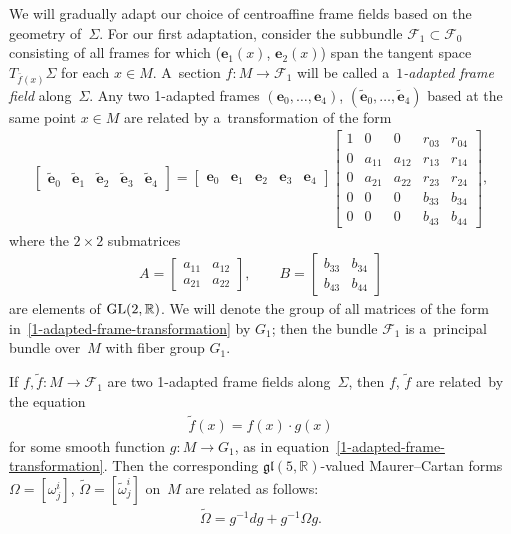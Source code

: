\documentclass[10pt,a4paper]{amsart}
\numberwithin{equation}{section}
\theoremstyle{definition}
\begin{document}
We will gradually adapt our choice of centroaf\/f\/ine frame f\/ields based on the geometry of~$\Sigma$.
For our f\/irst adaptation, consider the subbundle $\mathcal{F}_1 \subset \mathcal{F}_0$ consisting of all frames for
which ($\mathbf{e}_1(x)$, $\mathbf{e}_2(x)$) span the tangent space $T_{\bar{f}(x)}\Sigma$ for each $x \in M$.
A~section $f:M \to \mathcal{F}_1$ will be called a~{\em $1$-adapted frame field} along~$\Sigma$.
Any two 1-adapted frames $(\mathbf{e}_0, \ldots, \mathbf{e}_4)$, $(\tilde{\mathbf{e}}_0, \ldots, \tilde{\mathbf{e}}_4)$
based at the same point $x \in M$ are related by a~transformation of the form
\begin{gather}
\begin{bmatrix}
\tilde{\mathbf{e}}_0 & \tilde{\mathbf{e}}_1 & \tilde{\mathbf{e}}_2 & \tilde{\mathbf{e}}_3 & \tilde{\mathbf{e}}_4
\end{bmatrix}
=
\begin{bmatrix}
\mathbf{e}_0 & \mathbf{e}_1 & \mathbf{e}_2 & \mathbf{e}_3 & \mathbf{e}_4
\end{bmatrix}
\begin{bmatrix}
1 & 0 & 0 & r_{03} & r_{04}
\\
0 & a_{11} & a_{12} & r_{13} & r_{14}
\\
0 & a_{21} & a_{22} & r_{23} & r_{24}
\\
0 & 0 & 0 & b_{33} & b_{34}
\\
0 & 0 & 0 & b_{43} & b_{44}
\end{bmatrix},
\label{1-adapted-frame-transformation}
\end{gather}
where the $2\times 2$ submatrices
\begin{gather*}
A =
\begin{bmatrix}
a_{11} & a_{12}
\\
a_{21} & a_{22}
\end{bmatrix},
\qquad
B =
\begin{bmatrix}
b_{33} & b_{34}
\\
b_{43} & b_{44}
\end{bmatrix}
\end{gather*}
are elements of ${\rm GL}(2, \mathbb{R})$.
We will denote the group of all matrices of the form in~\eqref{1-adapted-frame-transformation} by $G_1$; then the bundle
$\mathcal{F}_1$ is a~principal bundle over~$M$ with f\/iber group $G_1$.

If $f, \tilde{f}:M \to \mathcal{F}_1$ are two 1-adapted frame f\/ields along~$\Sigma$, then $f$, $\tilde{f}$ are related~by
the equation
\begin{gather*}
\tilde{f}(x) = f(x) \cdot g(x)
\end{gather*}
for some smooth function $g:M \to G_1$, as in equation~\eqref{1-adapted-frame-transformation}.
Then the corresponding $\mathfrak{gl}(5, \mathbb{R})$-valued Maurer--Cartan forms $\Omega = [\omega^i_j]$,
$\tilde{\Omega} = [\tilde{\omega}^i_j]$ on~$M$ are related as follows:
\begin{gather}
\tilde{\Omega} = g^{-1} dg + g^{-1} \Omega g.
\label{how-MC-forms-transform}
\end{gather}
\end{document}
